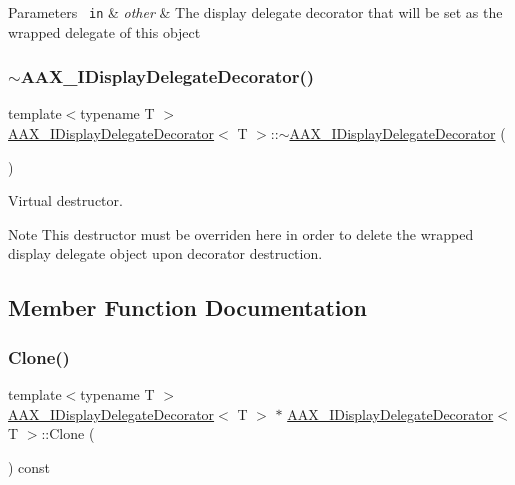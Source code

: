 \begin{DoxyParams}[1]{Parameters}
\mbox{\texttt{ in}}  & {\em other} & The display delegate decorator that will be set as the wrapped delegate of this object \\
\hline
\end{DoxyParams}
\mbox{\label{a01805_a65993ca0ac3d206e9526985190e2add9}} 
\subsubsection{\texorpdfstring{$\sim$AAX\_IDisplayDelegateDecorator()}{~AAX\_IDisplayDelegateDecorator()}}
{\footnotesize\ttfamily template$<$typename T $>$ \\
\mbox{\hyperlink{a01805}{A\+A\+X\+\_\+\+I\+Display\+Delegate\+Decorator}}$<$ T $>$\+::$\sim$\mbox{\hyperlink{a01805}{A\+A\+X\+\_\+\+I\+Display\+Delegate\+Decorator}} (\begin{DoxyParamCaption}{ }\end{DoxyParamCaption})}



Virtual destructor. 

\begin{DoxyNote}{Note}
This destructor must be overriden here in order to delete the wrapped display delegate object upon decorator destruction. 
\end{DoxyNote}


\subsection{Member Function Documentation}
\mbox{\label{a01805_a8e2ad7312467089a9112ba6460fe0e5b}} 
\subsubsection{\texorpdfstring{Clone()}{Clone()}}
{\footnotesize\ttfamily template$<$typename T $>$ \\
\mbox{\hyperlink{a01805}{A\+A\+X\+\_\+\+I\+Display\+Delegate\+Decorator}}$<$ T $>$ $\ast$ \mbox{\hyperlink{a01805}{A\+A\+X\+\_\+\+I\+Display\+Delegate\+Decorator}}$<$ T $>$\+::Clone (\begin{DoxyParamCaption}{ }\end{DoxyParamCaption}) const\hspace{0.3cm}{\ttfamily [virtual]}}



